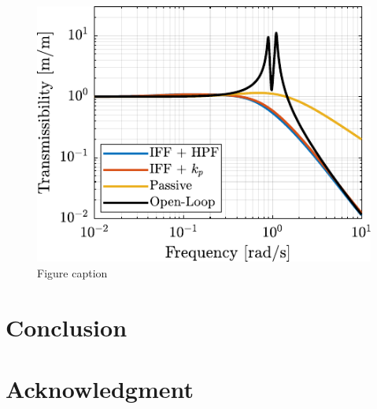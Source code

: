 \documentclass{ISMA_USD2020}
\begin{document}
\begin{figure}[htbp]
\centering
\includegraphics[scale=1]{figs/comp_transmissibility.pdf}
\caption{\label{fig:comp_transmissibility}Figure caption}
\end{figure}

\section{Conclusion}
\label{sec:org1b2b4ae}
\label{sec:conclusion}


\section*{Acknowledgment}
\label{sec:org2ae16a5}


\end{document}
